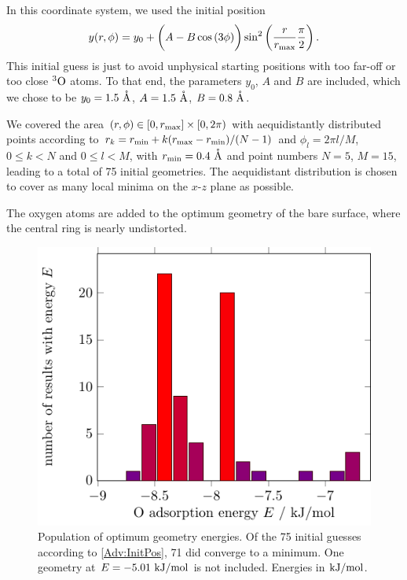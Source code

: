 \documentclass[8.5pt,twoside,twocolumn]{article}
\renewcommand{\Ang}{\mathring{\te{A}}}
\newcommand\tripo{\enmat{{^3\te{O}}}}
\newcommand\kmo{\enmat{\te {kJ/mol}}}
\theoremstyle{standard}
\begin{document}
In this coordinate system, we used the initial position
\begin{equation}
 y(r,\phi)=y_0+\left({\vphantom{\frac 1 2}  A-B\cos\left({3\phi}\right)}\right) \sin^2\left({\frac{r}{r_{\text{max}}}\frac\pi 2 }\right).
 \label{Adv:InitPos}
\end{equation}
This initial guess is
just to avoid unphysical starting positions with too far-off or too close $\tripo$
atoms. To that end, the parameters $y_0$, $A$ and $B$ are included, which we chose to be
$y_0=1.5~\Ang$, $A=1.5~\Ang$, $B=0.8~\Ang$.

We covered the area $(r,\phi) \in [0,r_{\text{max}}] \times [0, 2\pi)$ with aequidistantly
distributed points according to $r_k=r_{\text{min}}+k(r_{\text{max}}-r_{\text{min}})/(N-1)$ and $\phi_l=2\pi l/M$,
$0 \leq k < N$ and $0 \leq l < M$, with $\rmin=0.4~\Ang$ and point numbers
$N=5$, $M=15$, leading to a total of 75 initial geometries. The aequidistant
distribution is chosen to cover as many local minima on the $x$-$z$ plane as
possible.

The oxygen atoms are added to the optimum geometry of the bare surface, where
the central ring is nearly undistorted.

\begin{figure}[b!]
\includegraphics[width=.49\textwidth]{./TikzPics/TikzCreation/BindingEnergyDistribution/BindingEnergyDistribution.pdf}
\caption{Population of optimum geometry energies. Of the 75 initial guesses
according to \eqref{Adv:InitPos}, 71 did converge to a minimum. One
geometry at $E=-5.01~\kmo$ is not included. Energies in $\kmo$.}
\label{Fig:Adv:BindingSitesEnergies}
\end{figure}
\end{document}
